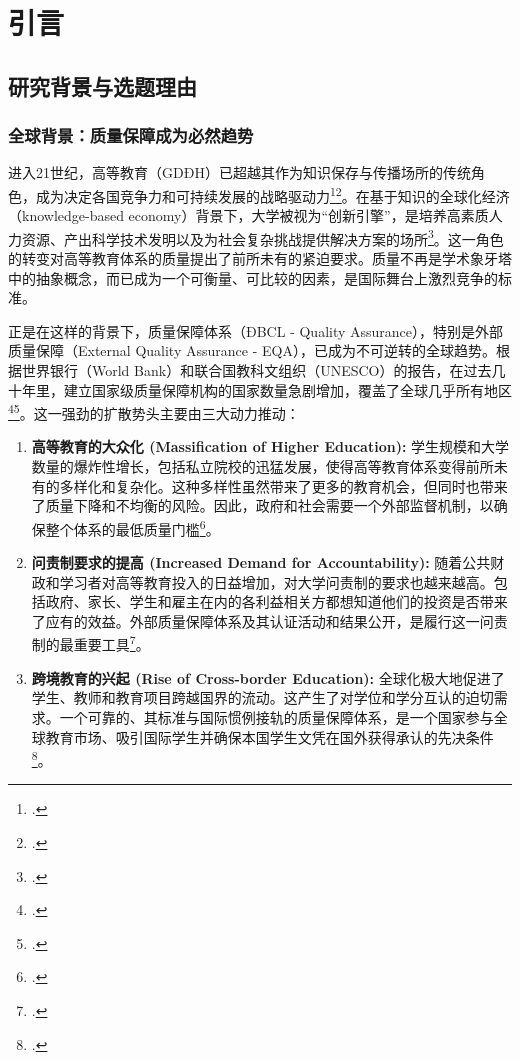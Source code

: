 
\chapter{引言}
\label{chap:gioi_thieu}

\section{研究背景与选题理由}
\label{sec:boi_canh_ly_do}

\subsection{全球背景：质量保障成为必然趋势}

进入21世纪，高等教育（GDĐH）已超越其作为知识保存与传播场所的传统角色，成为决定各国竞争力和可持续发展的战略驱动力\footcite{Altbach2001}\footcite{WB_KnowledgeEconomy}。在基于知识的全球化经济（knowledge-based economy）背景下，大学被视为“创新引擎”，是培养高素质人力资源、产出科学技术发明以及为社会复杂挑战提供解决方案的场所\footcite{OECD_HE2008}。这一角色的转变对高等教育体系的质量提出了前所未有的紧迫要求。质量不再是学术象牙塔中的抽象概念，而已成为一个可衡量、可比较的因素，是国际舞台上激烈竞争的标准。

正是在这样的背景下，质量保障体系（ĐBCL - Quality Assurance），特别是外部质量保障（External Quality Assurance - EQA），已成为不可逆转的全球趋势。根据世界银行（World Bank）和联合国教科文组织（UNESCO）的报告，在过去几十年里，建立国家级质量保障机构的国家数量急剧增加，覆盖了全球几乎所有地区\footcite{WorldBank_QA_GlobalTrends}\footcite{UNESCO_QA2018}。这一强劲的扩散势头主要由三大动力推动：

\begin{enumerate}
    \item \textbf{高等教育的大众化 (Massification of Higher Education):} 学生规模和大学数量的爆炸性增长，包括私立院校的迅猛发展，使得高等教育体系变得前所未有的多样化和复杂化。这种多样性虽然带来了更多的教育机会，但同时也带来了质量下降和不均衡的风险。因此，政府和社会需要一个外部监督机制，以确保整个体系的最低质量门槛\footcite{Trow2007}。
    
    \item \textbf{问责制要求的提高 (Increased Demand for Accountability):} 随着公共财政和学习者对高等教育投入的日益增加，对大学问责制的要求也越来越高。包括政府、家长、学生和雇主在内的各利益相关方都想知道他们的投资是否带来了应有的效益。外部质量保障体系及其认证活动和结果公开，是履行这一问责制的最重要工具\footcite{Harvey2005}。
    
    \item \textbf{跨境教育的兴起 (Rise of Cross-border Education):} 全球化极大地促进了学生、教师和教育项目跨越国界的流动。这产生了对学位和学分互认的迫切需求。一个可靠的、其标准与国际惯例接轨的质量保障体系，是一个国家参与全球教育市场、吸引国际学生并确保本国学生文凭在国外获得承认的先决条件\footcite{Knight2006}。
\end{enumerate}

